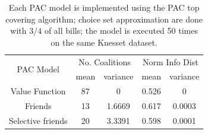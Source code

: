 \documentclass[letterpaper]{article} %
\begin{document}
\begin{table}[h!]
\centering
\begin{tabular}{c|c|c|c|c}
\hline
\multirow{2}{*}{ PAC Model } & \multicolumn{2}{c|}{ No. Coalitions } & \multicolumn{2}{|c}{ Norm Info Dist } \\
& mean & variance & mean & variance \\
\hline
Value Function & 87 & 0 & 0.526 & 0 \\
Friends & 13 & 1.6669 & 0.617 & 0.0003 \\
Selective friends & 20 & 3.3391 & 0.598 & 0.0001 \\
\hline
\end{tabular}
\caption{Each PAC model is implemented using the PAC top covering algorithm; choice set approximation are done with $3/4$ of all bills; the model is executed 50 times on the same Knesset dataset.}
\label{table:pac_models}
\end{table}



\end{document}
